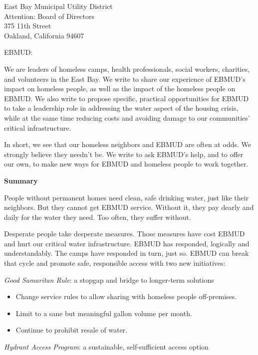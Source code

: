 \documentclass[letterpaper]{letter}
\begin{document}
  \begin{letter}{%
    East Bay Municipal Utility District\\
    Attention: Board of Directors\\
    375 11th Street\\
    Oakland, California 94607}

    \opening{EBMUD:}

    We are leaders of homeless camps, health professionals, social workers, charities, and volunteers in the East Bay. We write to share our experience of EBMUD’s impact on homeless people, as well as the impact of the homeless people on EBMUD. We also write to propose specific, practical opportunities for EBMUD to take a leadership role in addressing the water aspect of the housing crisis, while at the same time reducing costs and avoiding damage to our communities’ critical infrastructure.

    In short, we see that our homeless neighbors and EBMUD are often at odds. We strongly believe they needn’t be. We write to ask EBMUD’s help, and to offer our own, to make new ways for EBMUD and homeless people to work together.

    \begin{samepage}
    \textbf{Summary}

    People without permanent homes need clean, safe drinking water, just like their neighbors. But they cannot get EBMUD service. Without it, they pay dearly and daily for the water they need. Too often, they suffer without.

    Desperate people take desperate measures. Those measures have cost EBMUD and hurt our critical water infrastructure. EBMUD has responded, logically and understandably. The camps have responded in turn, just so. EBMUD can break that cycle and promote safe, responsible access with two new initiatives:

    \emph{Good Samaritan Rule}: a stopgap and bridge to longer-term solutions

    \begin{itemize}
      \item Change service rules to allow sharing with homeless people off-premises.
      \item Limit to a sane but meaningful gallon volume per month.
      \item Continue to prohibit resale of water.
    \end{itemize}

    \emph{Hydrant Access Program}: a sustainable, self-sufficient access option


\end{samepage}
\end{letter}
\end{document}
